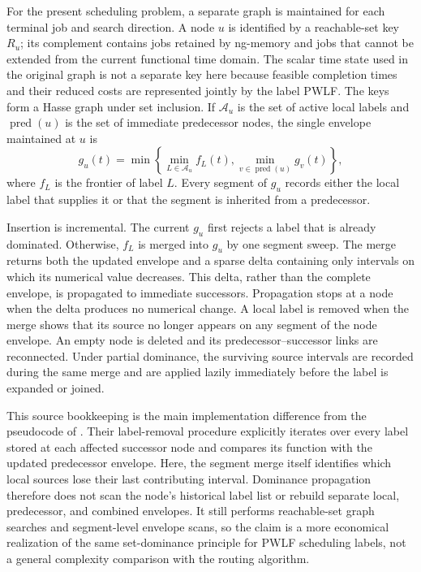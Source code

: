 For the present scheduling problem, a separate graph is maintained for each
terminal job and search direction. A node $u$ is identified by a reachable-set key
$R_u$; its complement contains jobs retained by ng-memory and jobs that cannot be
extended from the current functional time domain. The scalar time state used in
the original graph is not a separate key here because feasible completion times
and their reduced costs are represented jointly by the label PWLF. The keys form
a Hasse graph under set inclusion. If $\mathcal A_u$ is the set of active local
labels and $\operatorname{pred}(u)$ is the set of immediate predecessor nodes, the
single envelope maintained at $u$ is
\begin{equation}
    g_u(t)=
    \min\left\{
        \min_{L\in\mathcal A_u} f_L(t),
        \min_{v\in\operatorname{pred}(u)} g_v(t)
    \right\},
    \label{eq:sourced-dominance-envelope}
\end{equation}
where $f_L$ is the frontier of label $L$. Every segment of $g_u$ records either
the local label that supplies it or that the segment is inherited from a
predecessor.

Insertion is incremental. The current $g_u$ first rejects a label that is already
dominated. Otherwise, $f_L$ is merged into $g_u$ by one segment sweep. The merge
returns both the updated envelope and a sparse delta containing only intervals on
which its numerical value decreases. This delta, rather than the complete
envelope, is propagated to immediate successors. Propagation stops at a node when
the delta produces no numerical change. A local label is removed when the merge
shows that its source no longer appears on any segment of the node envelope. An
empty node is deleted and its predecessor--successor links are reconnected.
Under partial dominance, the surviving source intervals are recorded during the
same merge and are applied lazily immediately before the label is expanded or
joined.

This source bookkeeping is the main implementation difference from the
pseudocode of \citet{luo2017dominance}. Their label-removal procedure explicitly
iterates over every label stored at each affected successor node and compares its
function with the updated predecessor envelope. Here, the segment merge itself
identifies which local sources lose their last contributing interval. Dominance
propagation therefore does not scan the node's historical label list or rebuild
separate local, predecessor, and combined envelopes. It still performs
reachable-set graph searches and segment-level envelope scans, so the claim is a
more economical realization of the same set-dominance principle for PWLF
scheduling labels, not a general complexity comparison with the routing
algorithm.

